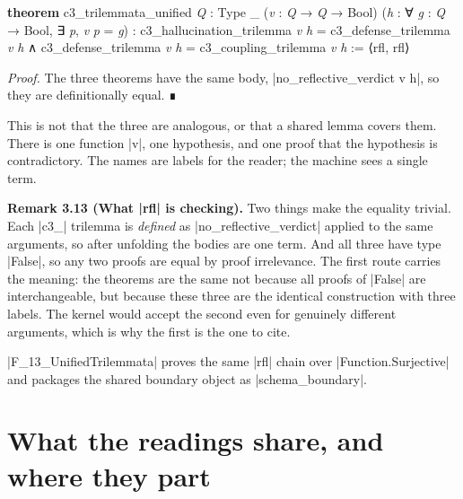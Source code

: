 \documentclass{memoir}
\begin{document}
\begin{LeanVerbatim}
\textbf{theorem} c3_trilemmata_unified \textit{Q} : Type _
    (\textit{v} : \textit{Q} → \textit{Q} → Bool)
    (\textit{h} : ∀ \textit{g} : \textit{Q} → Bool, ∃ \textit{p}, \textit{v} \textit{p} = \textit{g}) :
    c3_hallucination_trilemma \textit{v} \textit{h} = c3_defense_trilemma \textit{v} \textit{h}
      ∧ c3_defense_trilemma \textit{v} \textit{h}
        = c3_coupling_trilemma \textit{v} \textit{h} :=
  ⟨rfl, rfl⟩

\end{LeanVerbatim}


\emph{Proof.} The three theorems have the same body, \LeanVerb|no_reflective_verdict v h|, so they
are definitionally equal. ∎

This is not that the three are analogous, or that a shared lemma covers them.
There is one function \LeanVerb|v|, one hypothesis, and one proof that the hypothesis is
contradictory. The names are labels for the reader; the machine sees a single
term.

\textbf{Remark 3.13 (What \LeanVerb|rfl| is checking).} Two things make the equality trivial. Each
\LeanVerb|c3_| trilemma is \emph{defined} as \LeanVerb|no_reflective_verdict| applied to the same
arguments, so after unfolding the bodies are one term. And all three have type
\LeanVerb|False|, so any two proofs are equal by proof irrelevance. The first route
carries the meaning: the theorems are the same not because all proofs of \LeanVerb|False|
are interchangeable, but because these three are the identical construction with
three labels. The kernel would accept the second even for genuinely different
arguments, which is why the first is the one to cite.

\LeanVerb|F_13_UnifiedTrilemmata| proves the same \LeanVerb|rfl| chain over \LeanVerb|Function.Surjective|
and packages the shared boundary object as \LeanVerb|schema_boundary|.



\section{What the readings share, and where they part}\label{Two--Schemas--of--Impossibility-005F-005F-005F--Machine--Checked--Limits--of--Trustworthy--Machine--Learning-005F-005F-005F--and--Why--They--Tighten--with--Capability----Three--Trilemmata-005F-005F-005F--One--Theorem----What--the--readings--share-005F-005F-005F--and--where--they--part}
\end{document}
